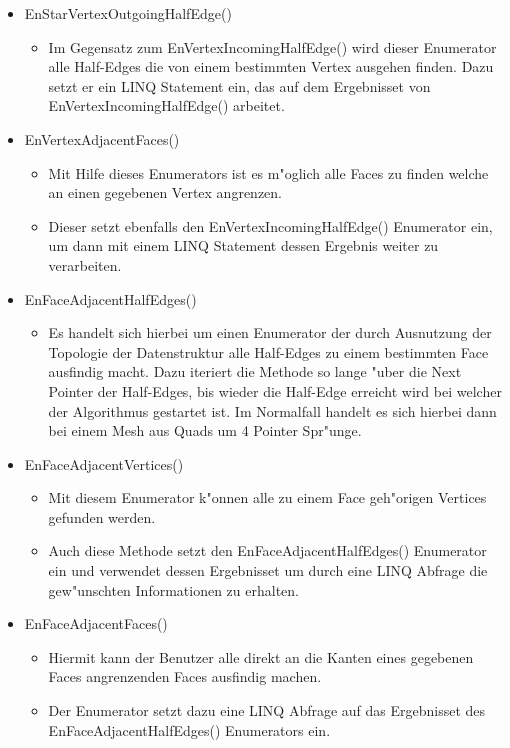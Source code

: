 \documentclass[pagesize, paper=a4, fontsize=12pt,titlepage=true, headings=small, headnosepline, abstractoff, liststotoc, nochapterprefix, plainheadsepline]{scrreprt}
\begin{document}
\begin{itemize}
\item EnStarVertexOutgoingHalfEdge()
	\begin{itemize}
	\item Im Gegensatz zum EnVertexIncomingHalfEdge() wird dieser Enumerator alle Half-Edges die von einem bestimmten Vertex ausgehen finden. Dazu setzt er ein LINQ Statement ein, das auf dem Ergebnisset von EnVertexIncomingHalfEdge() arbeitet.
	\end{itemize}
\item EnVertexAdjacentFaces()
	\begin{itemize}
	\item Mit Hilfe dieses Enumerators ist es m"oglich alle Faces zu finden welche an einen gegebenen Vertex angrenzen.
	\item Dieser setzt ebenfalls den EnVertexIncomingHalfEdge() Enumerator ein, um dann mit einem LINQ Statement dessen Ergebnis weiter zu verarbeiten.
	\end{itemize}
\item EnFaceAdjacentHalfEdges()
	\begin{itemize}
	\item Es handelt sich hierbei um einen Enumerator der durch Ausnutzung der Topologie der Datenstruktur alle Half-Edges zu einem bestimmten Face ausfindig macht. Dazu iteriert die Methode so lange "uber die Next Pointer der Half-Edges, bis wieder die Half-Edge erreicht wird bei welcher der Algorithmus gestartet ist. Im Normalfall handelt es sich hierbei dann bei einem Mesh aus Quads um 4 Pointer Spr"unge.
	\end{itemize}
\item EnFaceAdjacentVertices()
	\begin{itemize}
	\item Mit diesem Enumerator k"onnen alle zu einem Face geh"origen Vertices gefunden werden.
	\item Auch diese Methode setzt den EnFaceAdjacentHalfEdges() Enumerator ein und verwendet dessen Ergebnisset um durch eine LINQ Abfrage die gew"unschten Informationen zu erhalten.
	\end{itemize}
\item EnFaceAdjacentFaces()
	\begin{itemize}
	\item Hiermit kann der Benutzer alle direkt an die Kanten eines gegebenen Faces angrenzenden Faces ausfindig machen.
	\item Der Enumerator setzt dazu eine LINQ Abfrage auf das Ergebnisset des EnFaceAdjacentHalfEdges() Enumerators ein. 
	\end{itemize}
\end{itemize}
\end{document}
